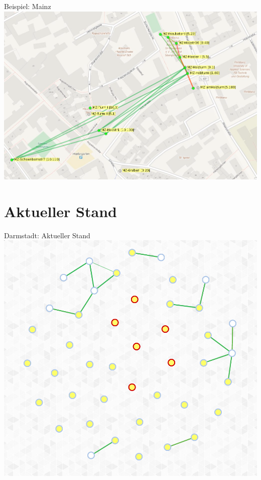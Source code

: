 \documentclass{beamer}
\begin{document}
\begin{frame}{Beispiel: Mainz}
\vfill
\centering
\includegraphics[width=\textwidth]{images/mainz}
\vfill
\end{frame}

\section{Aktueller Stand}
\begin{frame}{Darmstadt: Aktueller Stand}
\vfill
\centering
\includegraphics[scale=0.25]{images/darmstadt-graph}
\vfill
\end{frame}
\end{document}
